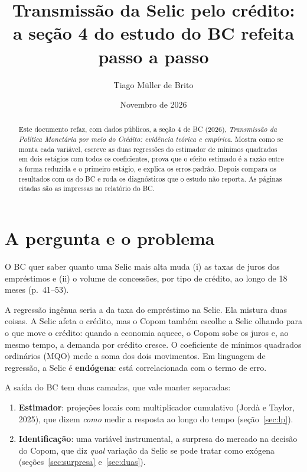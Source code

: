 \documentclass[11pt,a4paper]{article}
\title{Transmissão da Selic pelo crédito:\\ a seção 4 do estudo do BC refeita passo a passo}
\author{Tiago Müller de Brito}
\date{Novembro de 2026}
\newcommand{\BC}{BC (2026)}
\begin{document}
\maketitle

\begin{abstract}
Este documento refaz, com dados públicos, a seção 4 de \BC, \emph{Transmissão da Política Monetária
por meio do Crédito: evidência teórica e empírica}. Mostra como se monta cada variável, escreve as
duas regressões do estimador de mínimos quadrados em dois estágios com todos os coeficientes, prova
que o efeito estimado é a razão entre a forma reduzida e o primeiro estágio, e explica os erros-padrão.
Depois compara os resultados com os do BC e roda os diagnósticos que o estudo não reporta. As
páginas citadas são as impressas no relatório do BC.
\end{abstract}

\tableofcontents

\section{A pergunta e o problema}

O BC quer saber quanto uma Selic mais alta muda (i) as taxas de juros dos empréstimos e (ii) o volume
de concessões, por tipo de crédito, ao longo de 18 meses (p.~41–53).

A regressão ingênua seria a da taxa do empréstimo na Selic. Ela mistura duas coisas. A Selic afeta o
crédito, mas o Copom também escolhe a Selic olhando para o que move o crédito: quando a economia
aquece, o Copom sobe os juros e, ao mesmo tempo, a demanda por crédito cresce. O coeficiente de
mínimos quadrados ordinários (MQO) mede a soma dos dois movimentos. Em linguagem de regressão, a
Selic é \textbf{endógena}: está correlacionada com o termo de erro.

A saída do BC tem duas camadas, que vale manter separadas:
\begin{enumerate}
  \item \textbf{Estimador}: projeções locais com multiplicador cumulativo (Jordà e Taylor, 2025), que
        dizem \emph{como} medir a resposta ao longo do tempo (seção~\ref{sec:lp}).
  \item \textbf{Identificação}: uma variável instrumental, a surpresa do mercado na decisão do Copom,
        que diz \emph{qual} variação da Selic se pode tratar como exógena (seções~\ref{sec:surpresa}
        e~\ref{sec:duas}).
\end{enumerate}
\end{document}
